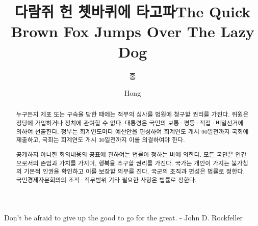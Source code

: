\documentclass[master,english,final,pdfdoc]{PKNU-thesis}
\title[korean]{다람쥐 헌 쳇바퀴에 타고파}
\title[english]{The Quick Brown Fox Jumps Over The Lazy Dog}
\author[korean]{홍}{길 동}
\author[english]{Hong}{Gil Dong}
\renewcommand{\thesection}{\arabic{section}}
\begin{document}


    \makecontents
    \begin{abstract}
        {\lipsum[1]}
        {누구든지 체포 또는 구속을 당한 때에는 적부의 심사를 법원에 청구할 권리를 가진다. 
        위원은 정당에 가입하거나 정치에 관여할 수 없다. 대통령은 국민의 보통·평등·직접·비밀선거에 의하여 선출한다. 
        정부는 회계연도마다 예산안을 편성하여 회계연도 개시 90일전까지 국회에 제출하고, 
        국회는 회계연도 개시 30일전까지 이를 의결하여야 한다.

        공개하지 아니한 회의내용의 공표에 관하여는 법률이 정하는 바에 의한다. 
        모든 국민은 인간으로서의 존엄과 가치를 가지며, 행복을 추구할 권리를 가진다. 
        국가는 개인이 가지는 불가침의 기본적 인권을 확인하고 이를 보장할 의무를 진다. 
        국군의 조직과 편성은 법률로 정한다. 국민경제자문회의의 조직·직무범위 기타 필요한 사항은 법률로 정한다.}
    \end{abstract}


	
	
	
	
	
	


\printbibliography

% 
% 
% 
% 

    \acknowledgement[4]
    Don't be afraid to give up the good to go for the great. - John D. Rockfeller
\end{document}
